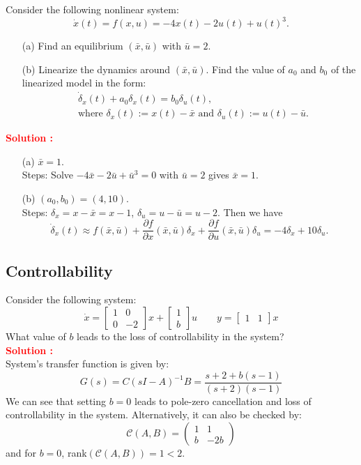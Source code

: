 \documentclass[12pt]{article}
\newcommand{\bmat}[1]{\begin{bmatrix} #1 \end{bmatrix}}
\newcommand{\pmat}[1]{\begin{pmatrix} #1 \end{pmatrix}}
\begin{document}
Consider the following nonlinear system:
$$\dot{x}(t) = f(x,u) =  -4x(t) - 2u(t) + u(t)^3.$$
\begin{itemize}
    \item[(a)] Find an equilibrium $(\bar{x},\bar{u})$ with $\bar{u} = 2.$
    \item[(b)] Linearize the dynamics around $(\bar{x},\bar{u})$. Find the value of $a_0$ and $b_0$ of the linearized model in the form:
    \begin{align*}
        &\dot{\delta}_x(t) + a_0 \delta_x(t) = b_0 \delta_u(t), \\
        &\text{where}\,\, \delta_x(t) := x(t) - \bar{x} \,\, \text{and} \,\, \delta_u(t) := u(t) - \bar{u}.
    \end{align*}
        \end{itemize}
\textbf{\textcolor{red}{Solution :}} \\
\begin{itemize}
    \item[(a)] $\bar{x} = 1.$ \\
    Steps:
    Solve $-4\bar{x} - 2\bar{u} + \bar{u}^3 = 0$ with $\bar{u} = 2$ gives $\bar{x} = 1$.  
    \item[(b)] $(a_0, b_0) = (4, 10).$ \\
    Steps:
    $\delta_x = x - \bar{x} = x-1$, $\delta_u = u - \bar{u} = u -2$. Then we have
    \begin{equation*}
        \dot{\delta}_x(t) \approx f(\bar{x}, \bar{u}) + \frac{\partial f}{\partial x} (\bar{x}, \bar{u}) \delta_x + \frac{\partial f}{\partial u} (\bar{x}, \bar{u}) \delta_u = -4 \delta_x + 10 \delta_u.
        \end{equation*}
\end{itemize}

\clearpage
\subsection{Controllability}

Consider the following system:
$$\dot{x} =\bmat{1 & 0 \\ 0 &-2}x + \bmat{1 \\ b} u \qquad y=\bmat{1 & 1}x$$
What value of $b$ leads to the loss of controllability in the system? \\
\textbf{\textcolor{red}{Solution :}} \\
System's transfer function is given by:
$$G(s) = C(sI - A)^{-1}B= \frac{s + 2 + b(s - 1)}{(s+2)(s-1)}$$
We can see that setting $b=0$ leads to pole-zero cancellation and loss of controllability in the system. Alternatively, it can also be checked by:
$$\mathcal{C}(A,B)=\pmat{1 & 1\\ b & -2b}$$
and for $b = 0$, rank$(\mathcal{C}(A, B)) = 1 <2$.
\clearpage
\end{document}
